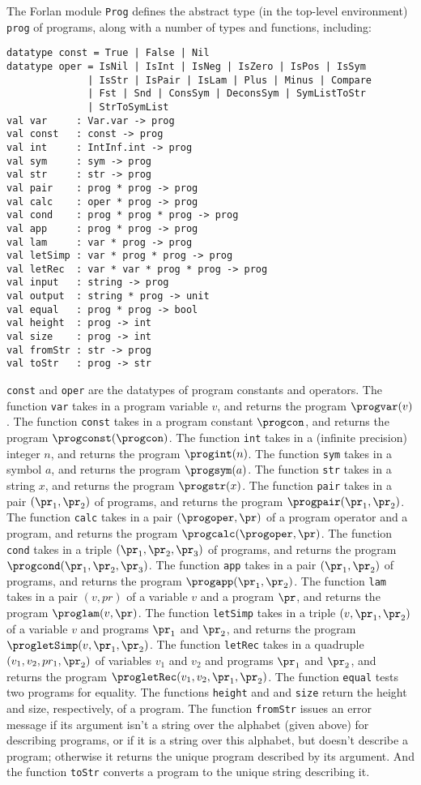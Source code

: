 The Forlan module \texttt{Prog} defines the abstract type (in the top-level
environment) \texttt{prog} of programs, along with a number of types and
functions, including:
\begin{verbatim}
datatype const = True | False | Nil
datatype oper = IsNil | IsInt | IsNeg | IsZero | IsPos | IsSym
              | IsStr | IsPair | IsLam | Plus | Minus | Compare
              | Fst | Snd | ConsSym | DeconsSym | SymListToStr
              | StrToSymList
val var     : Var.var -> prog
val const   : const -> prog
val int     : IntInf.int -> prog
val sym     : sym -> prog
val str     : str -> prog
val pair    : prog * prog -> prog
val calc    : oper * prog -> prog
val cond    : prog * prog * prog -> prog
val app     : prog * prog -> prog
val lam     : var * prog -> prog
val letSimp : var * prog * prog -> prog
val letRec  : var * var * prog * prog -> prog
val input   : string -> prog
val output  : string * prog -> unit
val equal   : prog * prog -> bool
val height  : prog -> int
val size    : prog -> int
val fromStr : str -> prog
val toStr   : prog -> str
\end{verbatim}
\texttt{const} and \texttt{oper} are the datatypes of program constants
and operators.
The function \texttt{var} takes in a program variable $v$, and
returns the program $\progvar(v)$.
The function \texttt{const} takes in a program constant $\progcon$,
and returns the program $\progconst(\progcon)$.
The function \texttt{int} takes in a (infinite precision) integer $n$,
and returns the program $\progint(n)$.
The function \texttt{sym} takes in a symbol $a$,
and returns the program $\progsym(a)$.
The function \texttt{str} takes in a string $x$,
and returns the program $\progstr(x)$.
The function \texttt{pair} takes in a pair $(\pr_1,\pr_2)$ of programs,
and returns the program $\progpair(\pr_1,\pr_2)$.
The function \texttt{calc} takes in a pair $(\progoper,\pr)$ of a
program operator and a program, and returns the program
$\progcalc(\progoper,\pr)$.
The function \texttt{cond} takes in a triple $(\pr_1,\pr_2,\pr_3)$ of programs,
and returns the program $\progcond(\pr_1,\pr_2,\pr_3)$.
The function \texttt{app} takes in a pair $(\pr_1,\pr_2)$ of programs,
and returns the program $\progapp(\pr_1,\pr_2)$.
The function \texttt{lam} takes in a pair $(v,pr)$ of a variable $v$
and a program $\pr$, and returns the program
$\proglam(v,\pr)$.
The function \texttt{letSimp} takes in a triple $(v,\pr_1,\pr_2)$ of a
variable $v$ and programs $\pr_1$ and $\pr_2$, and returns the program
$\progletSimp(v,\pr_1,\pr_2)$.
The function \texttt{letRec} takes in a quadruple
$(v_1,v_2,pr_1,\pr_2)$ of variables $v_1$ and $v_2$ and programs
$\pr_1$ and $\pr_2$, and returns the program
$\progletRec(v_1,v_2,\pr_1,\pr_2)$.
The function \texttt{equal} tests two programs for equality.
The functions \texttt{height} and and \texttt{size} return the height
and size, respectively, of a program.
The function \texttt{fromStr} issues an error message if its argument
isn't a string over the alphabet (given above) for describing
programs, or if it is a string over this alphabet, but doesn't
describe a program; otherwise it returns the unique program described
by its argument.  And the function \texttt{toStr} converts a program
to the unique string describing it.

